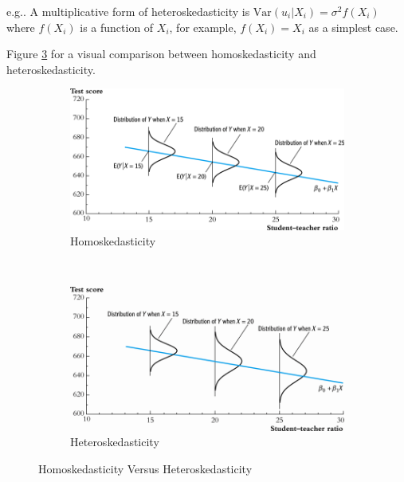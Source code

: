 \documentclass[a4paper,11pt]{article}
\newcommand{\var}{\mathrm{Var}}
\begin{document}
e.g.. A multiplicative form of heteroskedasticity is \(\var(u_i|X_i)
= \sigma^2 f(X_i)\) where \(f(X_i)\) is a function of \(X_i\), for
example, \(f(X_i) = X_i\) as a simplest case. 

Figure \ref{fig:homovshetero} for a visual comparison between
homoskedasticity and heteroskedasticity. 

\begin{figure}
    \centering
    \begin{subfigure}[!ht]{0.85\textwidth}
        \includegraphics[width=\textwidth]{./figure/fig-4-4}
        \caption{Homoskedasticity}
        \label{fig:homo1}
    \end{subfigure}
    ~ %
    \begin{subfigure}[!ht]{0.85\textwidth}
        \includegraphics[width=\textwidth]{./figure/fig-5-2}
        \caption{Heteroskedasticity}
        \label{fig:hetero1}
    \end{subfigure}
    \caption{Homoskedasticity Versus Heteroskedasticity}\label{fig:homovshetero}
\end{figure}
\end{document}
